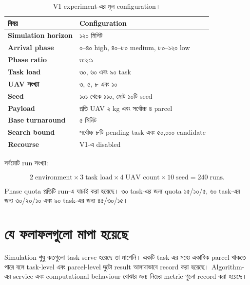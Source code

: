 \documentclass[10pt,a4paper]{article}
\begin{document}
\begin{table}[htbp]
\centering
\caption{V1 experiment-এর মূল configuration।}
\label{tab:protocol-bn}
\begin{tabularx}{0.95\textwidth}{@{}>{\bfseries}p{}X@{}}
\toprule
বিষয় & Configuration \\
\midrule
Simulation horizon & ১২০ মিনিট \\
Arrival phase & ০--৪০ high, ৪০--৮০ medium, ৮০--১২০ low \\
Phase ratio & ৩:২:১ \\
Task load & ৩০, ৬০ এবং ৯০ task \\
UAV সংখ্যা & ৩, ৫, ৮ এবং ১০ \\
Seed & ১০১ থেকে ১১০, মোট ১০টি seed \\
Payload & প্রতি UAV ২ kg এবং সর্বোচ্চ ৪ parcel \\
Base turnaround & ৫ মিনিট \\
Search bound & সর্বোচ্চ ৮টি pending task এবং ৫০,০০০ candidate \\
Recourse & V1-এ disabled \\
\bottomrule
\end{tabularx}
\end{table}

সর্বমোট run সংখ্যা:

\begin{equation*}
2\;\text{environment} \times 3\;\text{task load} \times 4\;\text{UAV count} \times 10\;\text{seed} = 240\;\text{runs}.
\end{equation*}

Phase quota প্রতিটি run-এ যাচাই করা হয়েছে। ৩০ task-এর জন্য quota ১৫/১০/৫, ৬০ task-এর জন্য ৩০/২০/১০ এবং ৯০ task-এর জন্য ৪৫/৩০/১৫।

\section{যে ফলাফলগুলো মাপা হয়েছে}

Simulation শুধু কতগুলো task serve হয়েছে তা মাপেনি। একটি task-এর মধ্যে একাধিক parcel থাকতে পারে বলে task-level এবং parcel-level দুটো result আলাদাভাবে record করা হয়েছে। Algorithm-এর service এবং computational behaviour বোঝার জন্য নিচের metric-গুলো record করা হয়েছে।
\end{document}
